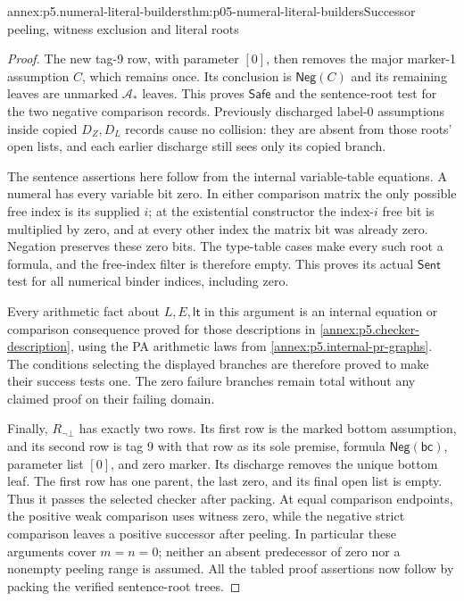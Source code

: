 \begin{annexitem}{annex:p5.numeral-literal-builders}{thm:p05-numeral-literal-builders}{Successor peeling, witness exclusion and literal roots}
\begin{proof}
The new tag-9 row, with parameter \([0]\), then removes the major marker-1
assumption \(C\), which remains once. Its conclusion is \(\mathsf{Neg}(C)\) and
its remaining leaves are unmarked \(\mathcal A_*\) leaves. This proves
\(\mathsf{Safe}\) and the sentence-root test for the two negative
comparison records. Previously discharged label-0 assumptions inside copied
\(D_Z,D_L\) records cause no collision: they are absent from those roots'
open lists, and each earlier discharge still sees only its copied branch.

The sentence assertions here follow from the internal variable-table
equations. A numeral has every variable bit zero. In either comparison
matrix the only possible free index is its supplied \(i\); at the
existential constructor the index-\(i\) free bit is multiplied by zero,
and at every other index the matrix bit was already zero. Negation preserves
these zero bits. The type-table cases make every such root a formula, and
the free-index filter is therefore empty. This proves its actual
\(\mathsf{Sent}\) test for all numerical binder indices, including zero.

Every arithmetic fact about \(L,E,\mathsf{lt}\) in this argument is an
internal equation or comparison consequence proved for those descriptions
in \cref{annex:p5.checker-description}, using the PA arithmetic laws from
\cref{annex:p5.internal-pr-graphs}. The conditions selecting the displayed
branches are therefore proved to make their success tests one. The zero
failure branches remain total without any claimed proof on their failing
domain.

Finally, \(R_{\neg\bot}\) has exactly two rows. Its first row is the
marked bottom assumption, and its second row is tag 9 with that row as its
sole premise, formula \(\mathsf{Neg}(\mathsf{bc})\), parameter list \([0]\), and
zero marker. Its discharge removes the unique bottom leaf. The first row
has one parent, the last zero, and its final open list is empty. Thus it
passes the selected checker after packing. At equal comparison endpoints,
the positive weak comparison uses witness zero, while the negative strict
comparison leaves a positive successor after peeling. In particular these
arguments cover \(m=n=0\); neither an absent predecessor of zero nor a
nonempty peeling range is assumed. All the tabled proof assertions now
follow by packing the verified sentence-root trees.
\end{proof}
\end{annexitem}

